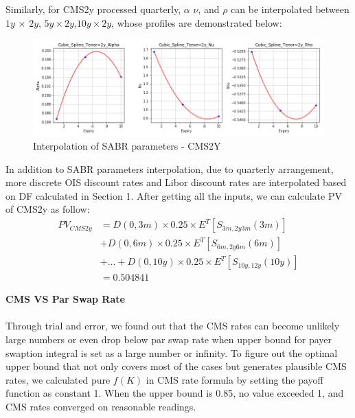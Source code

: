 \documentclass{article}
\begin{document}
\noindent Similarly, for CMS2y processed quarterly, $\alpha$ $\nu$, and $\rho$ can be interpolated between $1y$ $\times$ $2y$, $5y\times2y$,$10y\times2y$, whose profiles are demonstrated below:

\begin{figure}[h]
	\centering
	\includegraphics[scale=0.5]{Cubic_2y.png}
	\caption{Interpolation of SABR parameters - CMS2Y}
\end{figure}	

\noindent In addition to SABR parameters interpolation, due to quarterly arrangement, more discrete OIS discount rates and Libor discount rates are interpolated based on DF calculated in Section 1. After getting all the inputs, we can calculate PV of CMS2y as follow:
\begin{align*}
PV_{CMS2y}&=D(0,3m)\times 0.25 \times E^T [S_{3m,2y3m}(3m)] \\&+ D(0,6m) \times 0.25 \times E^T [S_{6m,2y6m}(6m)]\\&+ \dots 
+D(0,10y) \times 0.25 \times E^T [S_{10y,12y}(10y)]\\&= 0.504841
\end{align*}

\newpage

\noindent \textbf{CMS VS Par Swap Rate}\\ \\
Through trial and error, we found out that the CMS rates can become unlikely large numbers or even drop below par swap rate when upper bound for payer swaption integral is set as a large number or infinity. To figure out the optimal upper bound that not only covers most of the cases but generates plausible CMS rates, we calculated pure $f(K)$ in CMS rate formula by setting the payoff function as constant 1. When the upper bound is 0.85, no value exceeded 1, and CMS rates converged on reasonable readings.
\end{document}
